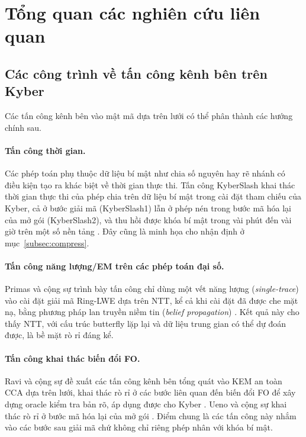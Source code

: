 \documentclass[../LuanVan.tex]{subfiles}
\begin{document}
\section{Tổng quan các nghiên cứu liên quan}\label{sec:lienquan}
\subsection{Các công trình về tấn công kênh bên trên Kyber}\label{subsec:tancong}

Các tấn công kênh bên vào mật mã dựa trên lưới có thể phân thành các hướng chính sau.

\paragraph{Tấn công thời gian.} Các phép toán phụ thuộc dữ liệu bí mật như chia số nguyên hay rẽ nhánh có điều kiện tạo ra khác biệt về thời gian thực thi. Tấn công KyberSlash khai thác thời gian thực thi của phép chia trên dữ liệu bí mật trong cài đặt tham chiếu của Kyber, cả ở bước giải mã (KyberSlash1) lẫn ở phép nén trong bước mã hóa lại của mở gói (KyberSlash2), và thu hồi được khóa bí mật trong vài phút đến vài giờ trên một số nền tảng \cite{KyberSlash24}. Đây cũng là minh họa cho nhận định ở mục~\ref{subsec:compress}.

\paragraph{Tấn công năng lượng/EM trên các phép toán đại số.} Primas và cộng sự trình bày tấn công chỉ dùng một vết năng lượng (\textit{single-trace}) vào cài đặt giải mã Ring-LWE dựa trên NTT, kể cả khi cài đặt đã được che mặt nạ, bằng phương pháp lan truyền niềm tin (\textit{belief propagation}) \cite{Primas17}. Kết quả này cho thấy NTT, với cấu trúc butterfly lặp lại và dữ liệu trung gian có thể dự đoán được, là bề mặt rò rỉ đáng kể.

\paragraph{Tấn công khai thác biến đổi FO.} Ravi và cộng sự đề xuất các tấn công kênh bên tổng quát vào KEM an toàn CCA dựa trên lưới, khai thác rò rỉ ở các bước liên quan đến biến đổi FO để xây dựng oracle kiểm tra bản rõ, áp dụng được cho Kyber \cite{Ravi20}. Ueno và cộng sự khai thác rò rỉ ở bước mã hóa lại của mở gói \cite{Ueno22}. Điểm chung là các tấn công này nhắm vào các bước sau giải mã chứ không chỉ riêng phép nhân với khóa bí mật.
\end{document}
